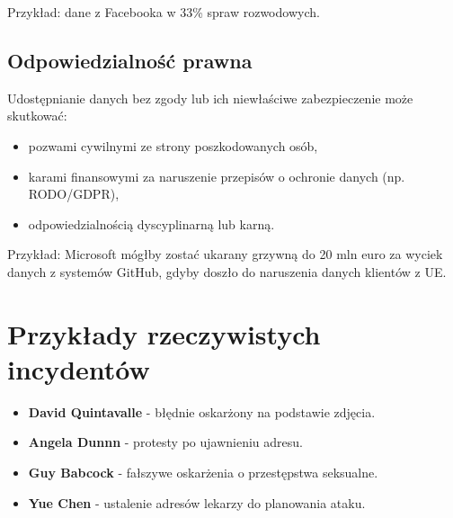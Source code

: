 Przykład: dane z Facebooka w 33\% spraw rozwodowych.

\subsection{Odpowiedzialność prawna}
Udostępnianie danych bez zgody lub ich niewłaściwe zabezpieczenie może skutkować:
\begin{itemize}
\item pozwami cywilnymi ze strony poszkodowanych osób,
\item karami finansowymi za naruszenie przepisów o ochronie danych (np. RODO/GDPR),
\item odpowiedzialnością dyscyplinarną lub karną.
\end{itemize}

Przykład: Microsoft mógłby zostać ukarany grzywną do 20 mln euro za wyciek danych z systemów GitHub, gdyby doszło do naruszenia danych klientów z UE.

\section{Przykłady rzeczywistych incydentów \cite{zagrozeniaFirmy, zagrozeniaLudzie}}
\begin{itemize}
  \item \textbf{David Quintavalle} - błędnie oskarżony na podstawie zdjęcia.
  \item \textbf{Angela Dunnn} - protesty po ujawnieniu adresu.
  \item \textbf{Guy Babcock} - fałszywe oskarżenia o przestępstwa seksualne.
  \item \textbf{Yue Chen} - ustalenie adresów lekarzy do planowania ataku.
\end{itemize}